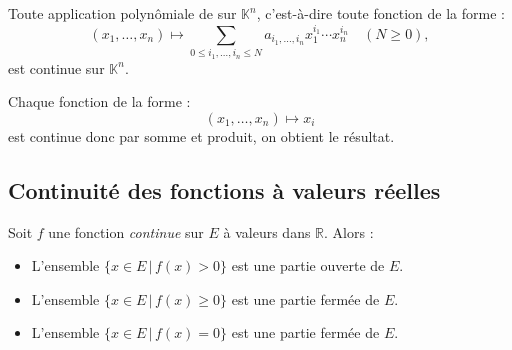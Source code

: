 \documentclass[a4paper,10pt]{report}
\begin{document}
\begin{Proposition}{} Toute application polynômiale de sur $\mathbb{K}^n$, c'est-à-dire toute fonction de la forme :
$$ (x_1, \ldots, x_n) \mapsto \sum_{0 \leq i_1, \ldots, i_n \leq N} a_{i_1, \ldots, i_n} x_1^{i_1} \cdots x_n^{i_n} \quad (N \geq 0),$$
est continue sur $\mathbb{K}^n$.
\end{Proposition}

\begin{Demonstration}{} Chaque fonction de la forme :
$$  (x_1, \ldots, x_n) \mapsto x_i$$
est continue donc par somme et produit, on obtient le résultat.
\end{Demonstration}



\subsection{Continuité des fonctions à valeurs réelles}

\begin{Proposition}{} Soit $f$ une fonction \emph{continue} sur $E$ à valeurs dans $\mathbb{R}$. Alors :

\begin{itemize}
\item L'ensemble $\lbrace x \in E \, \vert \, f(x)>0 \rbrace$ est une partie ouverte de $E$.
\item L'ensemble $\lbrace x \in E \, \vert \, f(x)\geq 0 \rbrace$ est une partie fermée de $E$.
\item L'ensemble $\lbrace x \in E \, \vert \, f(x) = 0 \rbrace$ est une partie fermée de $E$.
\end{itemize}
\end{Proposition}

\begin{Demonstration}{} 

\end{Demonstration}
\end{document}
